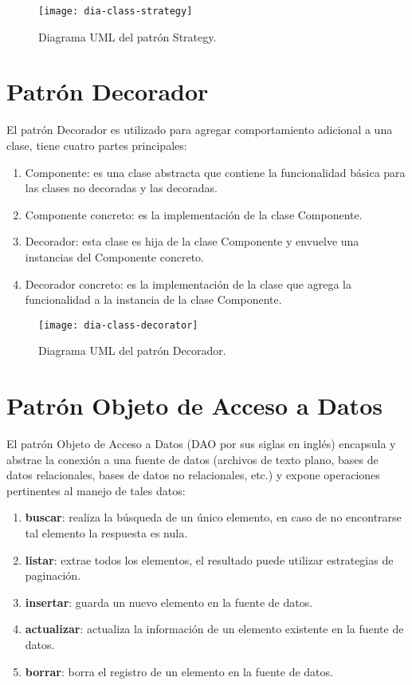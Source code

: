 \begin{figure}[h]
  \centering
  \texttt{[image: dia-class-strategy]}
  \caption{Diagrama UML del patrón Strategy\cite{DesignPatternsLasater}.}
  \label{fig:dia-class-strategy}
\end{figure}

\section{Patrón Decorador}
El patrón Decorador es utilizado para agregar comportamiento adicional a una clase, tiene cuatro partes principales\cite{DesignPatternsLasater}:
\begin{enumerate}
  \item Componente: es una clase abstracta que contiene la funcionalidad básica para las clases no decoradas y las decoradas.
  \item Componente concreto: es la implementación de la clase Componente.
  \item Decorador: esta clase es hija de la clase Componente y envuelve una instancias del Componente concreto.
  \item Decorador concreto: es la implementación de la clase que agrega la funcionalidad a la instancia de la clase Componente.
\end{enumerate}

\begin{figure}[h]
  \centering
  \texttt{[image: dia-class-decorator]}
  \caption{Diagrama UML del patrón Decorador\cite{DesignPatternsLasater}.}
  \label{fig:dia-class-decorator}
\end{figure}


\section{Patrón Objeto de Acceso a Datos}\label{sec-dao}
El patrón Objeto de Acceso a Datos (DAO por sus siglas en inglés) encapsula y abstrae la conexión a una fuente de datos (archivos de texto plano, bases de datos relacionales, bases de datos no relacionales, etc.) y expone operaciones pertinentes al manejo de tales datos\cite{OCPJavaSE7,OCAPJavaSE7}:
\begin{enumerate}
	\item [] \textbf{buscar}: realiza la búsqueda de un único elemento, en caso de no encontrarse tal elemento la respuesta es nula.
	\item [] \textbf{listar}: extrae todos los elementos, el resultado puede utilizar estrategias de paginación.
	\item [] \textbf{insertar}: guarda un nuevo elemento en la fuente de datos.
	\item [] \textbf{actualizar}: actualiza la información de un elemento existente en la fuente de datos.
	\item [] \textbf{borrar}: borra el registro de un elemento en la fuente de datos.
\end{enumerate}


